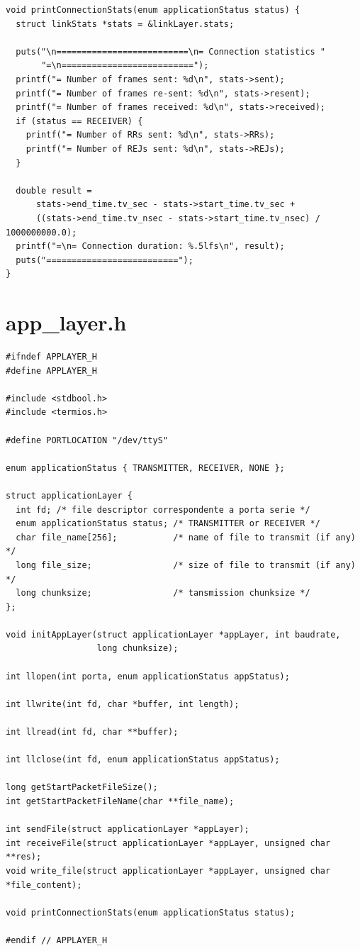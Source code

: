 \documentclass[11pt]{report}
\begin{document}
\begin{lstlisting}
void printConnectionStats(enum applicationStatus status) {
  struct linkStats *stats = &linkLayer.stats;

  puts("\n==========================\n= Connection statistics "
       "=\n==========================");
  printf("= Number of frames sent: %d\n", stats->sent);
  printf("= Number of frames re-sent: %d\n", stats->resent);
  printf("= Number of frames received: %d\n", stats->received);
  if (status == RECEIVER) {
    printf("= Number of RRs sent: %d\n", stats->RRs);
    printf("= Number of REJs sent: %d\n", stats->REJs);
  }

  double result =
      stats->end_time.tv_sec - stats->start_time.tv_sec +
      ((stats->end_time.tv_nsec - stats->start_time.tv_nsec) / 1000000000.0);
  printf("=\n= Connection duration: %.5lfs\n", result);
  puts("==========================");
}
\end{lstlisting}

\section{app\_layer.h}

\begin{lstlisting}
#ifndef APPLAYER_H
#define APPLAYER_H

#include <stdbool.h>
#include <termios.h>

#define PORTLOCATION "/dev/ttyS"

enum applicationStatus { TRANSMITTER, RECEIVER, NONE };

struct applicationLayer {
  int fd; /* file descriptor correspondente a porta serie */
  enum applicationStatus status; /* TRANSMITTER or RECEIVER */
  char file_name[256];           /* name of file to transmit (if any) */
  long file_size;                /* size of file to transmit (if any) */
  long chunksize;                /* tansmission chunksize */
};

void initAppLayer(struct applicationLayer *appLayer, int baudrate,
                  long chunksize);

int llopen(int porta, enum applicationStatus appStatus);

int llwrite(int fd, char *buffer, int length);

int llread(int fd, char **buffer);

int llclose(int fd, enum applicationStatus appStatus);

long getStartPacketFileSize();
int getStartPacketFileName(char **file_name);

int sendFile(struct applicationLayer *appLayer);
int receiveFile(struct applicationLayer *appLayer, unsigned char **res);
void write_file(struct applicationLayer *appLayer, unsigned char *file_content);

void printConnectionStats(enum applicationStatus status);

#endif // APPLAYER_H
\end{lstlisting}
\end{document}
